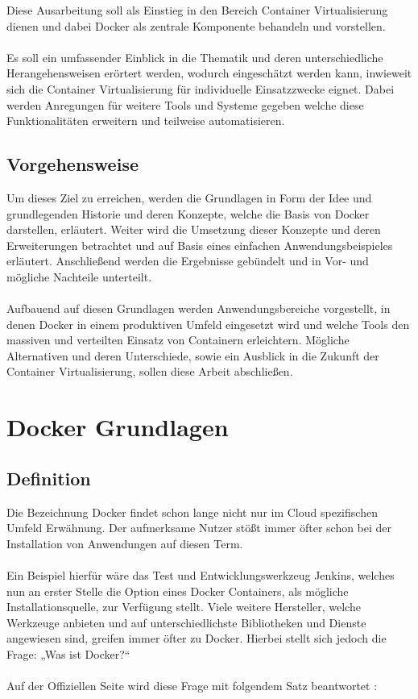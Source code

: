 \documentclass[12pt,toc=bib,toc=listof]{scrreprt}
\begin{document}
Diese Ausarbeitung soll als Einstieg in den Bereich Container Virtualisierung dienen und dabei Docker als zentrale Komponente behandeln und vorstellen.\\
\\
Es soll ein umfassender Einblick in die Thematik und deren unterschiedliche Herangehensweisen erörtert werden, wodurch eingeschätzt werden kann, inwieweit sich die Container Virtualisierung für individuelle Einsatzzwecke eignet.
Dabei werden Anregungen für weitere Tools und Systeme gegeben welche diese Funktionalitäten erweitern und teilweise automatisieren. 


\section{Vorgehensweise} %
\label{sec:vorgehensweise}

Um dieses Ziel zu erreichen, werden die Grundlagen in Form der Idee und grundlegenden Historie und deren Konzepte, welche die Basis von Docker darstellen, erläutert.
Weiter wird die Umsetzung dieser Konzepte und deren Erweiterungen betrachtet und auf Basis eines einfachen Anwendungsbeispieles erläutert.
Anschließend werden die Ergebnisse gebündelt und in Vor- und mögliche Nachteile unterteilt.\\
\\
Aufbauend auf diesen Grundlagen werden Anwendungsbereiche vorgestellt, in denen Docker in einem produktiven Umfeld eingesetzt wird und welche Tools den massiven und verteilten Einsatz von Containern erleichtern.
Mögliche Alternativen und deren Unterschiede, sowie ein Ausblick in die Zukunft der Container Virtualisierung, sollen diese Arbeit abschließen.




\chapter{Docker Grundlagen} %
\label{sec:grundlagen}

\section{Definition}

Die Bezeichnung Docker findet schon lange nicht nur im Cloud spezifischen Umfeld Erwähnung.
Der aufmerksame Nutzer stößt immer öfter schon bei der Installation von Anwendungen auf diesen Term.\\
\\
Ein Beispiel hierfür wäre das Test und Entwicklungswerkzeug Jenkins, welches nun an erster Stelle die Option eines Docker Containers, als mögliche Installationsquelle, zur Verfügung stellt. \cite{jenkins}
Viele weitere Hersteller, welche Werkzeuge anbieten und auf unterschiedlichste Bibliotheken und Dienste angewiesen sind, greifen immer öfter zu Docker. 
Hierbei stellt sich jedoch die Frage: „Was ist Docker?“ \\
\\
Auf der Offiziellen Seite wird diese Frage mit folgendem Satz beantwortet :
\end{document}
